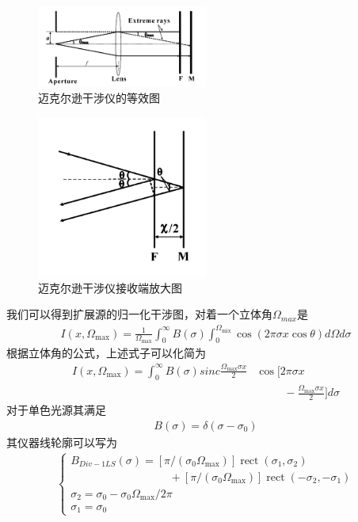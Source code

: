 \documentclass[conference]{IEEEtran}
\begin{document}
\begin{figure}[htbp]
    \centerline{\includegraphics[width=0.5\textwidth]{pic10.png}}
    \caption{迈克尔逊干涉仪的等效图}
    \label{pic10}
\end{figure}

\begin{figure}[htbp]
    \centerline{\includegraphics[width=0.5\textwidth]{pic11.png}}
    \caption{迈克尔逊干涉仪接收端放大图}
    \label{pic11}
\end{figure}
我们可以得到扩展源的归一化干涉图，对着一个立体角$\Omega_{max}$是
\begin{align*}
    I\left(x, \Omega_{\max }\right)=\frac{1}{\Omega_{\max }}\int_{0}^{\infty} B(\sigma) \int_{0}^{\Omega_{\operatorname{mix}}} \cos (2 \pi \sigma x \cos \theta) d \Omega d \sigma
\end{align*}
根据立体角的公式，上述式子可以化简为
\begin{align*}
    I\left(x, \Omega_{\max }\right)=\int_{0}^{\infty} B(\sigma) sinc \frac{\Omega_{\max } \sigma x }{2}  &\cos [2 \pi \sigma x\\
    & \;\;\;\;\;\;\;\;\;- \frac{\Omega_{\max } \sigma x }{2}] d \sigma
\end{align*}
对于单色光源其满足
\begin{align*}
    B(\sigma) = \delta(\sigma-\sigma_0)
\end{align*}
其仪器线轮廓可以写为
\begin{align*}
    \begin{cases}
        B_{D i v-1 L S}(\sigma)=[\pi /(\sigma_{0} \Omega_{\max })] \operatorname{rect}(\sigma_{1}, \sigma_{2})\\ \;\;\;\;\;\;\;\;\;\;\;\;\;\;\;\;\;\;\;\;\;\;\;\;\;\;\;\;\;\;\;\;+[\pi /(\sigma_{0} \Omega_{\max })] \operatorname{rect}(-\sigma_{2},-\sigma_{1}) \\
        \sigma_{2}=\sigma_{0}-\sigma_{0} \Omega_{\max } / 2 \pi \\
        \sigma_{1}=\sigma_{0}
    \end{cases}
\end{align*}
\end{document}
